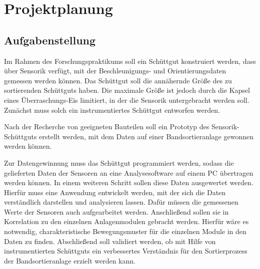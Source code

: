 \section{Projektplanung}

\subsection{Aufgabenstellung}
 
Im Rahmen des Forschungspraktikums soll ein Schüttgut konstruiert werden, dass über Sensorik verfügt, mit der Beschleunigungs- und Orientierungsdaten gemessen werden können. Das Schüttgut soll die annähernde Größe des zu sortierenden Schüttguts haben. Die maximale Größe ist jedoch durch die Kapsel eines Überraschungs-Eis limitiert, in der die Sensorik untergebracht werden soll. Zunächst muss solch ein instrumentiertes Schüttgut entworfen werden.
 
Nach der Recherche von geeigneten Bauteilen soll ein Prototyp des Sensorik-Schüttguts erstellt werden, mit dem Daten auf einer Bandsortieranlage gewonnen werden können.

Zur Datengewinnung muss das Schüttgut programmiert werden, sodass die gelieferten Daten der Sensoren an eine Analysesoftware auf einem PC übertragen werden können. In einem weiteren Schritt sollen diese Daten ausgewertet werden. Hierfür muss eine Anwendung entwickelt werden, mit der sich die Daten verständlich darstellen und analysieren lassen. Dafür müssen die gemessenen Werte der Sensoren auch aufgearbeitet werden. Anschließend sollen sie in Korrelation zu den einzelnen Anlagenmodulen gebracht werden. Hierfür wäre es notwendig, charakteristische Bewegungsmuster für die einzelnen Module in den Daten zu finden. 
Abschließend soll validiert werden, ob mit Hilfe von instrumentierten Schüttguts ein verbessertes Verständnis für den Sortierprozess der Bandsortieranlage erzielt werden kann.


